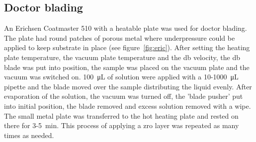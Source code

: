 \documentclass[a4paper]{article}
\newcommand{\ul}[1]{\SI{#1}{\micro\liter}}
\newcommand{\minutes}[1]{\SI{#1}{\minute}}
\begin{document}
\subsection{Doctor blading}
\label{sec:DB}
An Erichsen Coatmaster 510 with a heatable plate was used for doctor blading. The plate 
had round patches of porous metal where underpressure could be applied to keep substrate in place (see 
figure~\ref{fig:eric}). After setting the heating plate temperature, the vacuum plate 
temperature and the \gls{db} velocity, the \gls{db} blade 
was put into position, the sample was placed on the vacuum plate and the vacuum was 
switched on. %
\ul{100} of solution were 
applied with a 10-\ul{1000} pipette and the blade moved over the sample distributing the 
liquid evenly. After evaporation of the solution, the vacuum was turned off, the 'blade 
pusher' put into initial position, the blade removed and excess solution removed with a 
wipe. The small metal plate was transferred to the hot heating plate and rested on there 
for 3-\minutes{5}. %
This process of applying a \gls{zro} layer was repeated as many times as needed.
\end{document}
